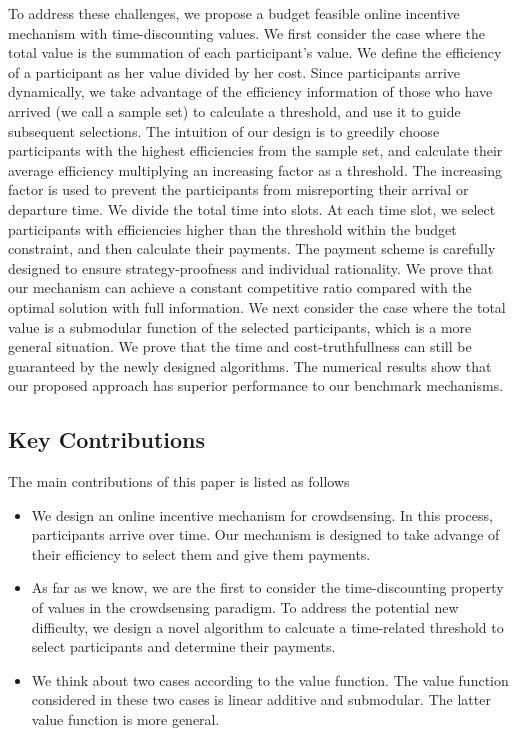 \documentclass[10pt,journal,letterpaper,compsoc]{IEEEtran}
\begin{document}
To address these challenges, we propose a budget feasible online incentive mechanism with time-discounting values. We first consider the case where the total value is the summation of each participant's value. We define the efficiency of a participant as her value divided by her cost. Since participants arrive dynamically, we take advantage of the efficiency information of those who have arrived (we call a sample set) to calculate a threshold, and use it to guide subsequent selections. The intuition of our design is to greedily choose participants with the highest efficiencies from the sample set, and calculate their average efficiency multiplying an increasing factor as a threshold. The increasing factor is used to prevent the participants from misreporting their arrival or departure time. We divide the total time into slots. At each time slot, we select participants with efficiencies higher than the threshold within the budget constraint, and then calculate their payments. The payment scheme is carefully designed to ensure strategy-proofness and individual rationality. We prove that our mechanism can achieve a constant competitive ratio compared with the optimal solution with full information. We next consider the case where the total value is a submodular function of the selected participants, which is a more general situation. We prove that the time and cost-truthfullness can still be guaranteed by the newly designed algorithms. The numerical results show that our proposed approach has superior performance to our benchmark mechanisms.
\subsection{Key Contributions}
The main contributions of this paper is listed as follows
\begin{itemize}
\item We design an online incentive mechanism for crowdsensing. In this process, participants arrive over time. Our mechanism is designed to take advange of their efficiency to select them and give them payments.

\item As far as we know, we are the first to consider the time-discounting property of values in the crowdsensing paradigm. To address the potential new difficulty, we design a novel algorithm to calcuate a time-related threshold to select participants and determine their payments.

\item We think about two cases according to the value function. The value function considered in these two cases is linear additive and submodular. The latter value function is more general.
\end{itemize}
\end{document}
